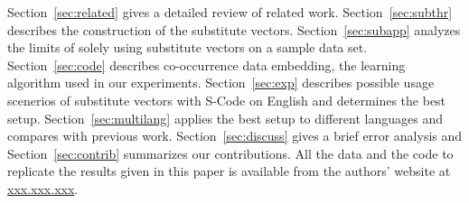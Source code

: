 Section~\ref{sec:related} gives a detailed review of related work.
Section~\ref{sec:subthr} describes the construction of the substitute
vectors.  Section~\ref{sec:subapp} analyzes the limits of solely using
substitute vectors on a sample data set.  Section~\ref{sec:code}
describes co-occurrence data embedding, the learning algorithm used in
our experiments.  Section~\ref{sec:exp} describes possible usage
scenerios of substitute vectors with S-Code on English and determines
the best setup.  Section~\ref{sec:multilang} applies the best setup to
different languages and compares with previous work.
Section~\ref{sec:discuss} gives a brief error analysis and
Section~\ref{sec:contrib} summarizes our contributions.  All the data
and the code to replicate the results given in this paper is available
from the authors' website at \mbox{\url{xxx.xxx.xxx}}.







